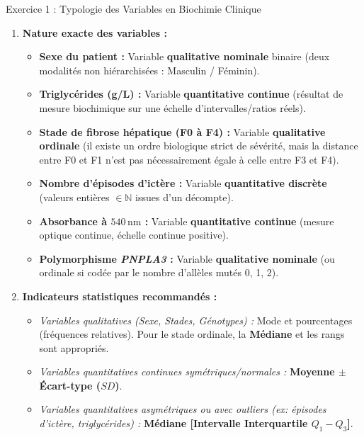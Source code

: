\documentclass[11pt,a4paper]{article}
\begin{document}

\begin{solutionbox}{Exercice 1 : Typologie des Variables en Biochimie Clinique}
\begin{enumerate}[label=\textbf{\alph*.}]
  \item \textbf{Nature exacte des variables :}
  \begin{itemize}
    \item \textbf{Sexe du patient :} Variable \textbf{qualitative nominale} binaire (deux modalités non hiérarchisées : Masculin / Féminin).
    \item \textbf{Triglycérides (g/L) :} Variable \textbf{quantitative continue} (résultat de mesure biochimique sur une échelle d'intervalles/ratios réels).
    \item \textbf{Stade de fibrose hépatique (F0 à F4) :} Variable \textbf{qualitative ordinale} (il existe un ordre biologique strict de sévérité, mais la distance entre F0 et F1 n'est pas nécessairement égale à celle entre F3 et F4).
    \item \textbf{Nombre d'épisodes d'ictère :} Variable \textbf{quantitative discrète} (valeurs entières $\in \mathbb{N}$ issues d'un décompte).
    \item \textbf{Absorbance à $540\,\text{nm}$ :} Variable \textbf{quantitative continue} (mesure optique continue, échelle continue positive).
    \item \textbf{Polymorphisme \textit{PNPLA3} :} Variable \textbf{qualitative nominale} (ou ordinale si codée par le nombre d'allèles mutés 0, 1, 2).
  \end{itemize}

  \item \textbf{Indicateurs statistiques recommandés :}
  \begin{itemize}
    \item \textit{Variables qualitatives (Sexe, Stades, Génotypes) :} Mode et pourcentages (fréquences relatives). Pour le stade ordinale, la \textbf{Médiane} et les rangs sont appropriés.
    \item \textit{Variables quantitatives continues symétriques/normales :} \textbf{Moyenne $\pm$ Écart-type ($SD$)}.
    \item \textit{Variables quantitatives asymétriques ou avec outliers (ex: épisodes d'ictère, triglycérides) :} \textbf{Médiane [Intervalle Interquartile $Q_1 - Q_3$]}.
  \end{itemize}
\end{enumerate}
\end{solutionbox}
\end{document}
